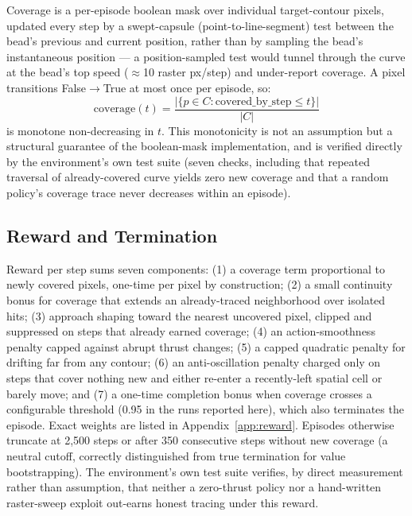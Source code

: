 \documentclass[conference]{IEEEtran}
\begin{document}
Coverage is a per-episode boolean mask over individual target-contour pixels, updated every step by a swept-capsule (point-to-line-segment) test between the bead's previous and current position, rather than by sampling the bead's instantaneous position --- a position-sampled test would tunnel through the curve at the bead's top speed ($\approx$10 raster px/step) and under-report coverage. A pixel transitions False$\to$True at most once per episode, so:
\begin{equation}
\text{coverage}(t) = \frac{|\{p \in C : \text{covered\_by\_step} \le t\}|}{|C|}
\label{eq:coverage}
\end{equation}
is monotone non-decreasing in $t$. This monotonicity is not an assumption but a structural guarantee of the boolean-mask implementation, and is verified directly by the environment's own test suite (seven checks, including that repeated traversal of already-covered curve yields zero new coverage and that a random policy's coverage trace never decreases within an episode).

\subsection{Reward and Termination}

Reward per step sums seven components: (1) a coverage term proportional to newly covered pixels, one-time per pixel by construction; (2) a small continuity bonus for coverage that extends an already-traced neighborhood over isolated hits; (3) approach shaping toward the nearest uncovered pixel, clipped and suppressed on steps that already earned coverage; (4) an action-smoothness penalty capped against abrupt thrust changes; (5) a capped quadratic penalty for drifting far from any contour; (6) an anti-oscillation penalty charged only on steps that cover nothing new and either re-enter a recently-left spatial cell or barely move; and (7) a one-time completion bonus when coverage crosses a configurable threshold (0.95 in the runs reported here), which also terminates the episode. Exact weights are listed in Appendix~\ref{app:reward}. Episodes otherwise truncate at 2{,}500 steps or after 350 consecutive steps without new coverage (a neutral cutoff, correctly distinguished from true termination for value bootstrapping). The environment's own test suite verifies, by direct measurement rather than assumption, that neither a zero-thrust policy nor a hand-written raster-sweep exploit out-earns honest tracing under this reward.
\end{document}

